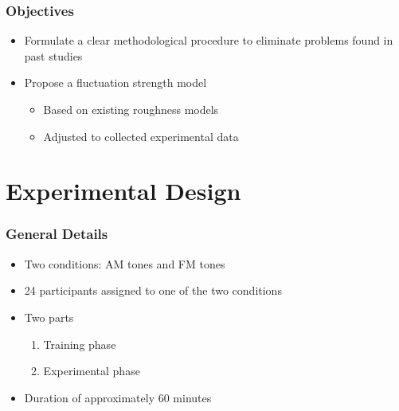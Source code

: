 \documentclass{beamer}
\begin{document}
\begin{frame}
  \frametitle{Objectives}
  \begin{itemize}
    \item Formulate a clear methodological procedure to eliminate problems
      found in past studies
    \pause{}
    \item Propose a fluctuation strength model
    \pause{}
    \begin{itemize}
      \item Based on existing roughness models
      \pause{}
      \item Adjusted to collected experimental data
    \end{itemize}
  \end{itemize}
\end{frame}

\section{Experimental Design}

\begin{frame}
  \frametitle{General Details}
  \begin{itemize}
    \item Two conditions: AM tones and FM tones
    \pause{}
    \item 24 participants assigned to one of the two conditions
    \pause{}
    \item Two parts
      \begin{enumerate}
        \item Training phase
        \item Experimental phase
      \end{enumerate}
    \pause{}
    \item Duration of approximately 60 minutes
  \end{itemize}
\end{frame}
\end{document}
